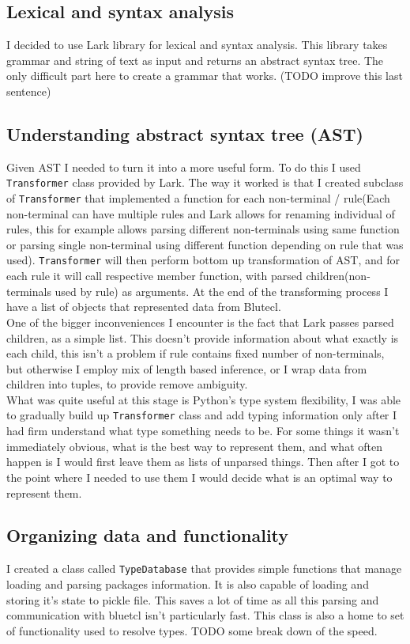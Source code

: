 \documentclass[14pt]{report}
\begin{document}
\subsection{Lexical and syntax analysis}
I decided to use Lark library for lexical and syntax analysis. This library takes grammar and string of text as input and returns an abstract syntax tree. The only difficult part here to create a grammar that works. (TODO improve this last sentence)

\subsection{Understanding abstract syntax tree (AST)}
Given AST I needed to turn it into a more useful form. To do this I used \verb!Transformer! class provided by Lark. The way it worked is that I created subclass of \verb!Transformer! that implemented a function for each non-terminal / rule(Each non-terminal can have multiple rules and Lark allows for renaming individual of rules, this for example allows parsing different non-terminals using same function or parsing single non-terminal using different function depending on rule that was used). \verb!Transformer! will then perform bottom up transformation of AST, and for each rule it will call respective member function, with parsed children(non-terminals used by rule) as arguments. At the end of the transforming process I have a list of objects that represented data from Blutecl.
\\
One of the bigger inconveniences I encounter is the fact that Lark passes parsed children, as a simple list. This doesn't provide information about what exactly is each child, this isn't a problem if rule contains fixed number of non-terminals, but otherwise I employ mix of length based inference, or I wrap data from children into tuples, to provide remove ambiguity.
\\
What was quite useful at this stage is Python's type system flexibility, I was able to gradually build up \verb!Transformer! class and add typing information only after I had firm understand what type something needs to be. For some things it wasn't immediately obvious, what is the best way to represent them, and what often happen is I would first leave them as lists of unparsed things. Then after I got to the point where I needed to use them I would decide what is an optimal way to represent them.

\subsection{Organizing data and functionality}
I created a class called \verb!TypeDatabase! that provides simple functions that manage loading and parsing packages information. It is also capable of loading and storing it's state to pickle file. This saves a lot of time as all this parsing and communication with bluetcl isn't particularly fast. This class is also a home to set of functionality used to resolve types.
TODO some break down of the speed.
\end{document}
